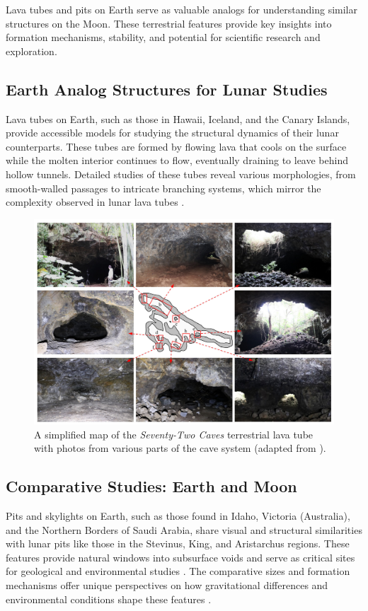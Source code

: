 Lava tubes and pits on Earth serve as valuable analogs for understanding similar structures on the Moon. These terrestrial features provide key insights into formation mechanisms, stability, and potential for scientific research and exploration.

\subsection{Earth Analog Structures for Lunar Studies}

Lava tubes on Earth, such as those in Hawaii, Iceland, and the Canary Islands, provide accessible models for studying the structural dynamics of their lunar counterparts. These tubes are formed by flowing lava that cools on the surface while the molten interior continues to flow, eventually draining to leave behind hollow tunnels. Detailed studies of these tubes reveal various morphologies, from smooth-walled passages to intricate branching systems, which mirror the complexity observed in lunar lava tubes \cite{bases-feng, sublunear-lava}.

\begin{figure}[H]
    \centering
    \includegraphics[width=0.8\linewidth]{earth-based-lavatube.png}
    \caption{A simplified map of the \textit{Seventy-Two Caves} terrestrial lava tube with photos from various parts of the cave system (adapted from \cite{bases-feng}).}
    \label{fig:terrestrial-lava-tubes}
\end{figure}

\subsection{Comparative Studies: Earth and Moon}

Pits and skylights on Earth, such as those found in Idaho, Victoria (Australia), and the Northern Borders of Saudi Arabia, share visual and structural similarities with lunar pits like those in the Stevinus, King, and Aristarchus regions. These features provide natural windows into subsurface voids and serve as critical sites for geological and environmental studies \cite{lunar-pits-entrances-to-caves, radar-observations-lava-tubes}. The comparative sizes and formation mechanisms offer unique perspectives on how gravitational differences and environmental conditions shape these features \cite{lunar-pit-distribution, bases-feng}.

